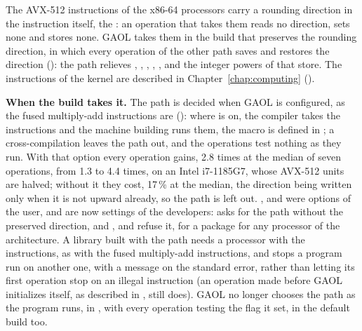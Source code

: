 \documentclass[12pt,a4paper,twoside,openright]{book}
\begin{document}
The AVX-512 instructions of the x86-64 processors carry a rounding direction
in the instruction itself, the : an operation that
takes them reads no direction, sets none and stores none. GAOL takes them in
the build that preserves the rounding direction, in which every operation of
the other path saves and restores the direction
(): the path relieves \code{+}, \code{-},
\code{*}, \code{/}, ,  and the integer powers of that
store.\newinvfive{} The instructions of the kernel are described in
Chapter~\ref{chap:computing} ().

\medskip
\noindent
\textbf{When the build takes it.} The path is decided when GAOL is configured,
as the fused multiply-add instructions are (): where
 is on, the compiler takes the instructions
and the machine building runs them, the macro 
is defined in ; a cross-compilation leaves
the path out, and the operations test nothing as they run. With that option
every operation gains, 2.8 times at the median of seven operations, from 1.3
to 4.4 times, on an Intel i7-1185G7, whose AVX-512 units are halved; without
it they cost, 17\,\% at the median, the direction being written only when it
is not upward already, so the path is left out. ,
 and  were
options of the user, and are now settings of the developers:\newinvfive{}
 asks for the path without the preserved direction, and
,  and
 refuse it, for a package for any
processor of the architecture. A library built with the path needs a processor
with the instructions, as with the fused multiply-add instructions, and
 stops a program run on another one, with a message on the
standard error, rather than letting its first operation stop on an illegal
instruction (an operation made before GAOL initializes itself, as described
in , still does). GAOL no longer chooses the path as the
program runs, in , with every operation testing the flag it set,
in the default build too.\newinvfive
\end{document}
